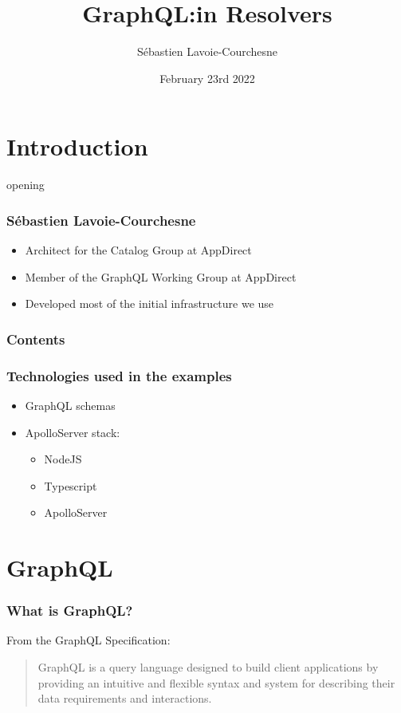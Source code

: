 \documentclass[notes]{beamer}
\title{GraphQL:\@Thinking in Resolvers}
\author{Sébastien Lavoie-Courchesne}
\date{February 23rd 2022}
\begin{document}
\begin{frame}
  \titlepage{}
\end{frame}

\section{Introduction}
\begin{frame}
  opening
\end{frame}


\begin{frame}
  \frametitle{Sébastien Lavoie-Courchesne}
  \begin{itemize}
  \item Architect for the Catalog Group at AppDirect
  \item Member of the GraphQL Working Group at AppDirect
  \item Developed most of the initial infrastructure we use
  \end{itemize}
\end{frame}


\begin{frame}
  \frametitle{Contents}
\end{frame}


\begin{frame}
  \frametitle{Technologies used in the examples}
  \begin{itemize}
  \item GraphQL schemas
  \item ApolloServer stack:
    \begin{itemize}
    \item NodeJS
    \item Typescript
    \item ApolloServer
    \end{itemize}
  \end{itemize}
\end{frame}


\section{GraphQL}
\begin{frame}
  \frametitle{What is GraphQL?}
  From the GraphQL Specification\cite{graphql-spec}:
  \begin{quote}
    GraphQL is a query language designed to build client applications by providing an intuitive and flexible syntax and system for describing their data requirements and interactions.
  \end{quote}
\end{frame}
\end{document}
